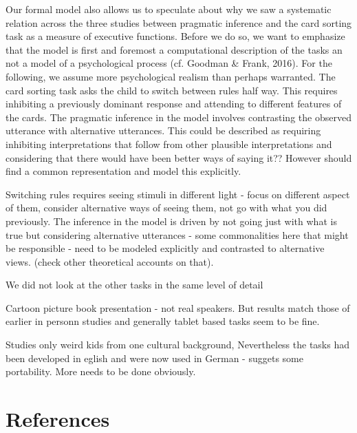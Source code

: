 \documentclass[
  english,
  man,floatsintext]{apa6}
\begin{document}
Our formal model also allows us to speculate about why we saw a systematic relation across the three studies between pragmatic inference and the card sorting task as a measure of executive functions. Before we do so, we want to emphasize that the model is first and foremost a computational description of the tasks an not a model of a psychological process (cf. Goodman \& Frank, 2016). For the following, we assume more psychological realism than perhaps warranted. The card sorting task asks the child to switch between rules half way. This requires inhibiting a previously dominant response and attending to different features of the cards. The pragmatic inference in the model involves contrasting the observed utterance with alternative utterances. This could be described as requiring inhibiting interpretations that follow from other plausible interpretations and considering that there would have been better ways of saying it?? However should find a common representation and model this explicitly.

Switching rules requires seeing stimuli in different light - focus on different aspect of them, consider alternative ways of seeing them, not go with what you did previously. The inference in the model is driven by not going just with what is true but considering alternative utterances - some commonalities here that might be responsible - need to be modeled explicitly and contrasted to alternative views. (check other theoretical accounts on that).

We did not look at the other tasks in the same level of detail

Cartoon picture book presentation - not real speakers. But results match those of earlier in personn studies and generally tablet based tasks seem to be fine.

Studies only weird kids from one cultural background, Nevertheless the tasks had been developed in eglish and were now used in German - suggets some portability. More needs to be done obviously.

\newpage

\hypertarget{references}{%
\section{References}\label{references}}

\begingroup
\setlength{\parindent}{-0.5in}
\setlength{\leftskip}{0.5in}
\end{document}
